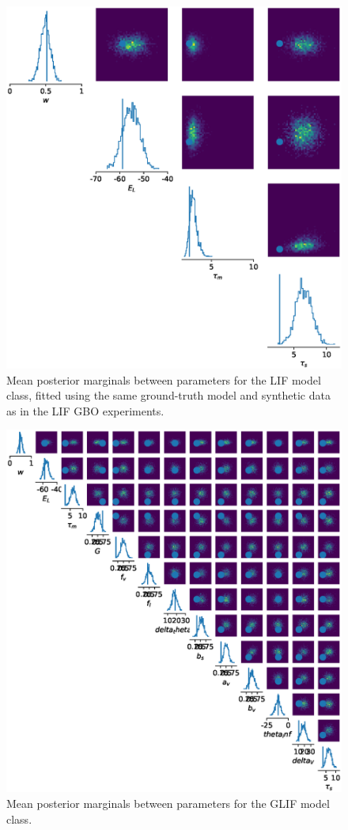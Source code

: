 \documentclass[mphil,deptreport,ianc]{infthesis} %
\begin{document}
\begin{figure}
    \centering
	\includegraphics[width=0.9\columnwidth]{figures/sbi_p_avgs_pairplot_SNPE_LIF_12-15_04-56-19-338.eps}
	\caption{Mean posterior marginals between parameters for the LIF model class, fitted using the same ground-truth model and synthetic data as in the LIF GBO experiments.}
	\label{fig:mean_posterior_marginal_SNPE_LIF}
\end{figure}

\begin{figure}
    \centering
	\includegraphics[width=\columnwidth]{figures/sbi_p_avgs_pairplot_SNPE_GLIF_12-15_14-22-38-919.eps}
	\caption{Mean posterior marginals between parameters for the GLIF model class.}
	\label{fig:mean_posterior_marginal_SNPE_GLIF}
\end{figure}
\end{document}
